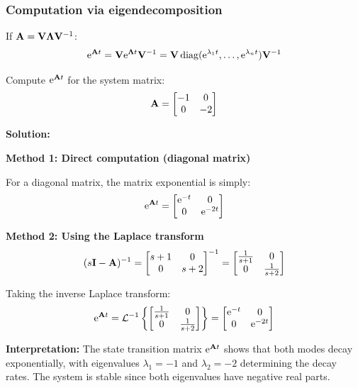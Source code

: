 \subsubsection{Computation via eigendecomposition}
If $\mathbf{A} = \mathbf{V}\boldsymbol{\Lambda}\mathbf{V}^{-1}$:
\begin{equation}
\mathrm{e}^{\mathbf{A} t} = \mathbf{V}\mathrm{e}^{\boldsymbol{\Lambda} t}\mathbf{V}^{-1} = \mathbf{V}\operatorname{diag}(\mathrm{e}^{\lambda_1 t}, \ldots, \mathrm{e}^{\lambda_n t})\mathbf{V}^{-1}
\end{equation}

\begin{examplebox}[title=Example: Computing Matrix Exponential for a Simple System]
Compute $\mathrm{e}^{\mathbf{A} t}$ for the system matrix:
\[
\mathbf{A} = \begin{bmatrix} -1 & 0 \\ 0 & -2 \end{bmatrix}
\]

\textbf{Solution:}

\textbf{Method 1: Direct computation (diagonal matrix)}

For a diagonal matrix, the matrix exponential is simply:
\[
\mathrm{e}^{\mathbf{A} t} = \begin{bmatrix} \mathrm{e}^{-t} & 0 \\ 0 & \mathrm{e}^{-2t} \end{bmatrix}
\]

\textbf{Method 2: Using the Laplace transform}
\[
(s\mathbf{I} - \mathbf{A})^{-1} = \begin{bmatrix} s+1 & 0 \\ 0 & s+2 \end{bmatrix}^{-1} = \begin{bmatrix} \frac{1}{s+1} & 0 \\ 0 & \frac{1}{s+2} \end{bmatrix}
\]

Taking the inverse Laplace transform:
\[
\mathrm{e}^{\mathbf{A} t} = \mathcal{L}^{-1}\left\{\begin{bmatrix} \frac{1}{s+1} & 0 \\ 0 & \frac{1}{s+2} \end{bmatrix}\right\} = \begin{bmatrix} \mathrm{e}^{-t} & 0 \\ 0 & \mathrm{e}^{-2t} \end{bmatrix}
\]

\textbf{Interpretation:} The state transition matrix $\mathrm{e}^{\mathbf{A} t}$ shows that both modes decay exponentially, with eigenvalues $\lambda_1 = -1$ and $\lambda_2 = -2$ determining the decay rates. The system is stable since both eigenvalues have negative real parts.
\end{examplebox}

